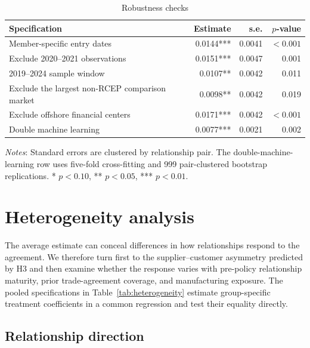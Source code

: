 \documentclass[preprint,12pt,authoryear]{elsarticle}
\begin{document}
\begin{table}[H]
\centering
\caption{Robustness checks}
\label{tab:robustness}
\scriptsize
\begin{threeparttable}
\begin{tabular*}{\textwidth}{@{\extracolsep{\fill}}lrrr}
\toprule
Specification & Estimate & s.e. & $p$-value \\
\midrule
Member-specific entry dates & 0.0144*** & 0.0041 & $<0.001$ \\
Exclude 2020--2021 observations & 0.0151*** & 0.0047 & 0.001 \\
2019--2024 sample window & 0.0107** & 0.0042 & 0.011 \\
Exclude the largest non-RCEP comparison market & 0.0098** & 0.0042 & 0.019 \\
Exclude offshore financial centers & 0.0171*** & 0.0042 & $<0.001$ \\
Double machine learning & 0.0077*** & 0.0021 & 0.002 \\
\bottomrule
\end{tabular*}
\begin{tablenotes}[flushleft]
\item
\footnotesize \textit{Notes}: Standard errors are clustered by relationship pair. The double-machine-learning row uses five-fold cross-fitting and 999 pair-clustered bootstrap replications. * $p<0.10$, ** $p<0.05$, *** $p<0.01$.
\end{tablenotes}
\end{threeparttable}
\end{table}
 
\section{Heterogeneity analysis}
\label{sec:heterogeneity}

The average estimate can conceal differences in how relationships respond to the agreement. We therefore turn first to the supplier--customer asymmetry predicted by H3 and then examine whether the response varies with pre-policy relationship maturity, prior trade-agreement coverage, and manufacturing exposure. The pooled specifications in Table~\ref{tab:heterogeneity} estimate group-specific treatment coefficients in a common regression and test their equality directly.

\subsection{Relationship direction}
\end{document}
